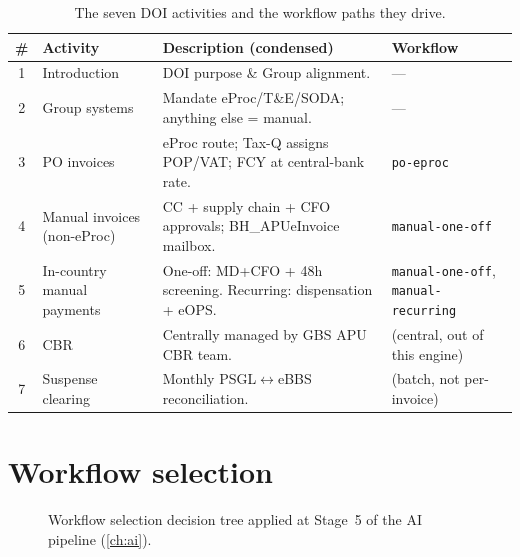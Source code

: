 \begin{table}[htbp]
\centering
\caption{The seven DOI activities and the workflow paths they drive.}
\label{tab:doi-activities}
\small
\begin{tabularx}{\linewidth}{@{}c l X l@{}}
\toprule
\# & \textbf{Activity} & \textbf{Description (condensed)} & \textbf{Workflow} \\ \midrule
1 & Introduction & DOI purpose \& Group alignment. & --- \\
2 & Group systems & Mandate eProc/T\&E/SODA; anything else = manual. & --- \\
3 & PO invoices  & eProc route; Tax-Q assigns POP/VAT; FCY at central-bank rate. & \texttt{po-eproc} \\
4 & Manual invoices (non-eProc) & CC + supply chain + CFO approvals; BH\_APUeInvoice mailbox. & \texttt{manual-one-off} \\
5 & In-country manual payments & One-off: MD+CFO + 48h screening. Recurring: dispensation + eOPS. & \texttt{manual-one-off}, \texttt{manual-recurring} \\
6 & CBR   & Centrally managed by GBS APU CBR team. & (central, out of this engine) \\
7 & Suspense clearing & Monthly PSGL$\leftrightarrow$eBBS reconciliation. & (batch, not per-invoice) \\
\bottomrule
\end{tabularx}
\end{table}

\section{Workflow selection}

\begin{figure}[htbp]
\centering
{}
\caption{Workflow selection decision tree applied at Stage~5 of the AI
         pipeline (\cref{ch:ai}).}
\label{fig:workflow-select}
\end{figure}

